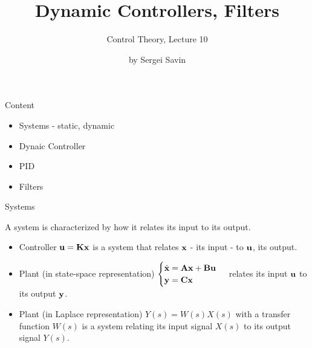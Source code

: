 \documentclass{beamer}
\title{Dynamic Controllers, Filters}
\subtitle{Control Theory, Lecture 10}
\author{by Sergei Savin}
\date{\mydate}
\begin{document}
\maketitle



\begin{frame}{Content}
\begin{itemize}
\item Systems - static, dynamic
\item Dynaic Controller
\item PID
\item Filters
\end{itemize}
\end{frame}




\begin{frame}{Systems}
\begin{flushleft}

A system is characterized by how it relates its input to its output.

\begin{itemize}
	\item Controller $\mathbf{u} = \mathbf{K}\mathbf{x}$ is a system that relates $\mathbf{x}$ - its input - to $\mathbf{u}$, its output. 
	
	\item Plant (in state-space representation) 
$\begin{cases}
		\dot {\mathbf{x}} = \mathbf{A} \mathbf{x} + \mathbf{B} \mathbf{u} \\
		\mathbf{y} = \mathbf{C} \mathbf{x}
	\end{cases}$ 
relates its input $\mathbf{u}$ to its output $\mathbf{y}$.

	\item Plant (in Laplace representation) $Y(s) = W(s)X(s)$ with a transfer function $W(s)$ is a system relating its input signal $X(s)$ to its output signal $Y(s)$.
\end{itemize}

\end{flushleft}
\end{frame}
\end{document}

